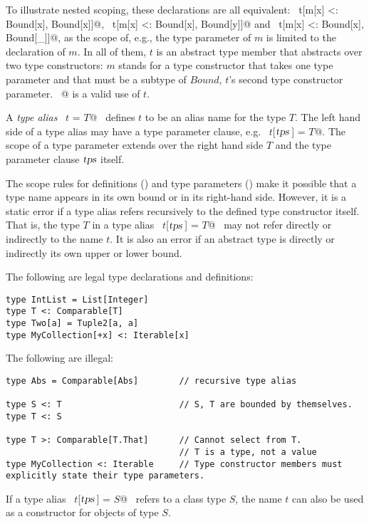 To illustrate nested scoping, these declarations are all equivalent: ~\lstinline@type t[m[x] <: Bound[x], Bound[x]]@, ~\lstinline@type t[m[x] <: Bound[x], Bound[y]]@ and ~\lstinline@type t[m[x] <: Bound[x], Bound[_]]@, as the scope of, e.g., the type parameter of $m$ is limited to the declaration of $m$. In all of them, $t$ is an abstract type member that abstracts over two type constructors: $m$ stands for a type constructor that takes one type parameter and that must be a subtype of $Bound$, $t$'s second type constructor parameter. ~@ is a valid use of $t$.

A {\em type alias} ~\lstinline@type $t$ = $T$@~ defines $t$ to be an alias
name for the type $T$.  The left hand side of a type alias may
have a type parameter clause, e.g. ~\lstinline@type $t$[$\mbox{\sl tps}\,$] = $T$@.  The scope
of a type parameter extends over the right hand side $T$ and the
type parameter clause $\mbox{\sl tps}$ itself.  

The scope rules for definitions () and type parameters
() make it possible that a type name appears in its
own bound or in its right-hand side.  However, it is a static error if
a type alias refers recursively to the defined type constructor itself.  
That is, the type $T$ in a type alias ~\lstinline@type $t$[$\mbox{\sl tps}\,$] = $T$@~ may not 
refer directly or indirectly to the name $t$.  It is also an error if
an abstract type is directly or indirectly its own upper or lower bound.

\example The following are legal type declarations and definitions:
\begin{lstlisting}
type IntList = List[Integer]
type T <: Comparable[T]
type Two[a] = Tuple2[a, a]
type MyCollection[+x] <: Iterable[x]
\end{lstlisting}

The following are illegal:
\begin{lstlisting}
type Abs = Comparable[Abs]        // recursive type alias

type S <: T                       // S, T are bounded by themselves.
type T <: S

type T >: Comparable[T.That]      // Cannot select from T.
                                  // T is a type, not a value
type MyCollection <: Iterable     // Type constructor members must explicitly state their type parameters.
\end{lstlisting}

If a type alias ~\lstinline@type $t$[$\mbox{\sl tps}\,$] = $S$@~ refers to a class type
$S$, the name $t$ can also be used as a constructor for
objects of type $S$.

